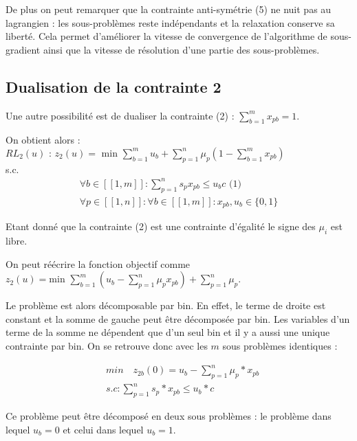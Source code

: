\documentclass{article}
\begin{document}
De plus on peut remarquer que la contrainte anti-symétrie (5) ne nuit pas au lagrangien : les sous-problèmes reste indépendants et la relaxation conserve sa liberté. Cela permet d'améliorer la vitesse de convergence de l'algorithme de sous-gradient ainsi que la vitesse de résolution d'une partie des sous-problèmes.

\subsection{Dualisation de la contrainte 2}

Une autre possibilité est de dualiser la contrainte (2) : $\sum_{b=1}^m x_{pb} = 1$. \newline

On obtient alors :\\
$RL_2(u) \text{ : } z_2(u) = \text{ min } \sum \limits_{b = 1}^{m} u_b + \sum \limits_{p = 1}^{n} \mu_p (1 - \sum \limits_{b = 1}^{m} x_{pb})$\\
s.c.
\begin{align*}
 \forall b \in [\![ 1 , m ]\!] : \sum \limits_{p = 1}^{n} s_p x_{pb} \leqslant u_b c \text{ (1)}\\
 \forall p \in [\![ 1 , n ]\!] : \forall b \in [\![ 1 , m ]\!] : x_{pb}, u_b \in \{0,1\}
\end{align*}

Etant donné que la contrainte (2) est une contrainte d'égalité le signe des $\mu_i$ est libre.\newline

On peut réécrire la fonction objectif comme $z_2(u) = \text{min } \sum \limits_{b = 1}^{m} \left( u_b - \sum \limits_{p = 1}^{n} \mu_p x_{pb} \right) + \sum \limits_{p = 1}^{n} \mu_p$.\newline

Le problème est alors décomposable par bin. En effet, le terme de droite est constant et la somme de gauche peut être décomposée par bin. Les variables d'un terme de la somme ne dépendent que d'un seul bin et il y a aussi une unique contrainte par bin. On se retrouve donc avec les $m$ sous problèmes identiques :

\begin{align*}
    &min \quad z_{2b}(0) = u_b - \sum \limits_{p=1}^n \mu_p*x_{pb}\\
    &s.c: \sum \limits_{p=1}^n s_p*x_{pb} \leq u_b*c
\end{align*}

Ce problème peut être décomposé en deux sous problèmes : le problème dans lequel $u_b = 0$ et celui dans lequel $u_b = 1$.\newline
\end{document}
